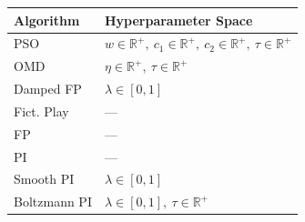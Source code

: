 \begin{tabular}{ll}
\toprule
Algorithm & Hyperparameter Space \\
\midrule
PSO & $w \in \mathbb{R}^+,\ c_1 \in \mathbb{R}^+,\ c_2 \in \mathbb{R}^+,\ \tau \in \mathbb{R}^+$ \\
OMD & $\eta \in \mathbb{R}^+,\ \tau \in \mathbb{R}^+$ \\
Damped FP & $\lambda \in [0,1]$ \\
Fict. Play & --- \\
FP & --- \\
PI & --- \\
Smooth PI & $\lambda \in [0,1]$ \\
Boltzmann PI & $\lambda \in [0,1],\ \tau \in \mathbb{R}^+$ \\
\bottomrule
\end{tabular}
